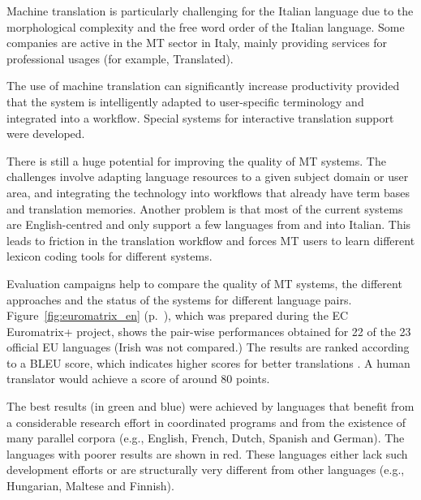 \documentclass[]{../../metanetpaper}
\begin{document}
\begin{multicols}{2}
 


Machine translation is particularly challenging for the Italian language due to the morphological complexity and the free word order of the Italian language. Some companies are active in the MT sector in Italy, mainly providing services for professional usages (for example, Translated).

The use of machine translation can significantly increase productivity
provided that the system is intelligently adapted to user-specific terminology
and integrated into a workflow. Special systems for interactive translation
support were developed.

There is still a huge potential for improving the quality of MT systems. The challenges involve adapting language resources to a given subject domain or user area, and integrating the technology into workflows that already have term bases and translation memories. Another problem is that most of the current systems are English-centred and only support a few languages from and into Italian. This leads to friction in the translation workflow and forces MT users to learn different lexicon coding tools for different systems.

Evaluation campaigns help to compare the quality of MT systems, the different approaches and the status of the systems for different language pairs. Figure~\ref{fig:euromatrix_en} (p.~\pageref{fig:euromatrix_en}), which was prepared during the EC Euromatrix+ project, shows the pair-wise performances obtained for 22 of the 23 official EU languages (Irish was not compared.) The results are ranked according to a BLEU score, which indicates higher scores for better translations \cite{bleu1}. A human translator would achieve a score of around 80 points. 

The best results (in green and blue) were achieved by languages that benefit from a considerable research effort in coordinated programs and from the existence of many parallel corpora (e.g., English, French, Dutch, Spanish and German). The languages with poorer results are shown in red. These languages either lack such development efforts or are structurally very different from other languages (e.g., Hungarian, Maltese and Finnish).







\end{multicols}
\end{document}
